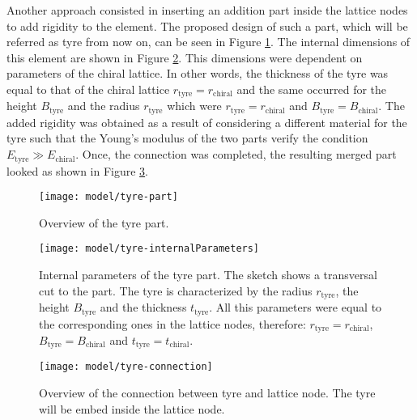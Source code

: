 Another approach consisted in inserting an addition part inside the lattice nodes to add rigidity to the element. The proposed design of such a part, which will be referred as tyre from now on, can be seen in Figure \ref{fig:tyre-part}. The internal dimensions of this element are shown in Figure \ref{fig:tyre-internalParameters}. This dimensions were dependent on parameters of the chiral lattice. In other words, the thickness of the tyre was equal to that of the chiral lattice $r_{\mathrm{tyre}} = r_{\mathrm{chiral}}$ and the same occurred for the height $B_{\mathrm{tyre}}$ and the radius $r_{\mathrm{tyre}}$ which were $r_{\mathrm{tyre}} = r_{\mathrm{chiral}}$ and $B_{\mathrm{tyre}} = B_{\mathrm{chiral}}$. The added rigidity was obtained as a result of considering a different material for the tyre such that the Young's modulus of the two parts verify the condition $E_{\mathrm{tyre}} \gg E_{\mathrm{chiral}}$. Once, the connection was completed, the resulting merged part looked as shown in Figure \ref{fig:tyre-connection}.

\begin{figure}[!htpb]
  \centering
  \texttt{[image: model/tyre-part]}
  \caption[Overview of the tyre part]{Overview of the tyre part.}\label{fig:tyre-part}
\end{figure}

\begin{figure}[!htpb]
  \centering
  \texttt{[image: model/tyre-internalParameters]}
  \caption[Internal parameters of the tyre part]{Internal parameters of the tyre part. The sketch shows a transversal cut to the part. The tyre is characterized by the radius $r_{\mathrm{tyre}}$, the height $B_{\mathrm{tyre}}$ and the thickness $t_{\mathrm{tyre}}$. All this parameters were equal to the corresponding ones in the lattice nodes, therefore: $r_{\mathrm{tyre}} = r_{\mathrm{chiral}}$, $B_{\mathrm{tyre}} = B_{\mathrm{chiral}}$ and $t_{\mathrm{tyre}} = t_{\mathrm{chiral}}$.}\label{fig:tyre-internalParameters}
\end{figure}

\begin{figure}[!htpb]
  \centering
  \texttt{[image: model/tyre-connection]}
  \caption[Overview of the connection between tyre and lattice node]{Overview of the connection between tyre and lattice node. The tyre will be embed inside the lattice node.}\label{fig:tyre-connection}
\end{figure}

\clearpage
